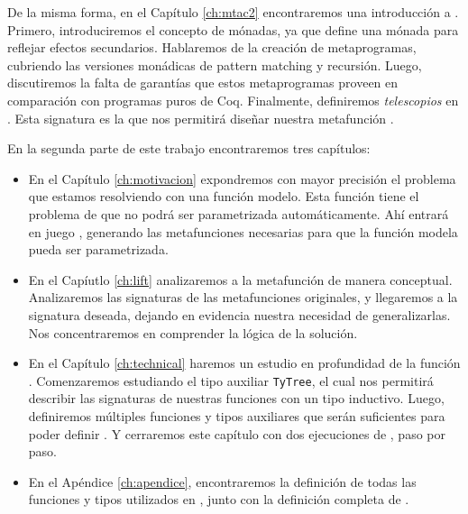 De la misma forma, en el Capítulo \ref{ch:mtac2} encontraremos una introducción a \Mtac.
Primero, introduciremos el concepto de mónadas, ya que \mtac define una mónada para reflejar efectos secundarios.
Hablaremos de la creación de metaprogramas, cubriendo las versiones monádicas de pattern matching y recursión.
Luego, discutiremos la falta de garantías que estos metaprogramas proveen en comparación con programas puros de Coq.
Finalmente, definiremos \emph{telescopios} en \Mtac. Esta signatura es la que nos permitirá diseñar nuestra metafunción \lift.

En la segunda parte de este trabajo encontraremos tres capítulos:

\begin{itemize}
 \item En el Capítulo \ref{ch:motivacion} expondremos con mayor precisión el problema que estamos resolviendo con una función modelo.
 Esta función tiene el problema de que no podrá ser parametrizada automáticamente.
 Ahí entrará en juego \lift, generando las metafunciones necesarias para que la función modela pueda ser parametrizada.
 \item En el Capíutlo \ref{ch:lift} analizaremos a la metafunción \lift de manera conceptual.
 Analizaremos las signaturas de las metafunciones originales, y llegaremos a la signatura deseada, dejando en evidencia nuestra necesidad de generalizarlas.
 Nos concentraremos en comprender la lógica de la solución.
 \item En el Capítulo \ref{ch:technical} haremos un estudio en profundidad de la función \lift.
 Comenzaremos estudiando el tipo auxiliar \lstinline{TyTree}, el cual nos permitirá describir las signaturas de nuestras funciones con un tipo inductivo.
 Luego, definiremos múltiples funciones y tipos auxiliares que serán suficientes para poder definir \lift.
 Y cerraremos este capítulo con dos ejecuciones de \lift, paso por paso.
 \item En el Apéndice \ref{ch:apendice}, encontraremos la definición de todas las funciones y tipos utilizados en \lift, junto con la definición completa de \lift.
\end{itemize}